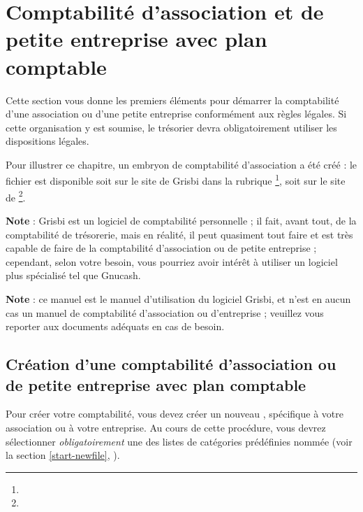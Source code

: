 \newpage


\section{Comptabilité d'association et de petite entreprise avec plan comptable\label{association-plan}}


Cette section vous donne les premiers éléments pour démarrer la comptabilité d'une association ou d'une petite entreprise conformément aux règles légales. Si cette organisation y est soumise, le trésorier devra obligatoirement utiliser les dispositions légales.

Pour illustrer ce chapitre, un embryon de comptabilité d'association a été créé : le fichier  est disponible soit sur le site de Grisbi dans la rubrique \footnote{\urlGrisbi{}}, soit sur le site de \footnote{\urlSourceForgeDocumentation{}}.

\textbf{Note} : Grisbi est un logiciel de comptabilité personnelle ; il fait, avant tout, de la comptabilité de trésorerie, mais en réalité, il peut quasiment tout faire et est très capable de faire de la comptabilité d'association ou de petite entreprise ; cependant, selon votre besoin, vous pourriez avoir intérêt à utiliser un logiciel plus spécialisé tel que \gls{Gnucash}.

\textbf{Note} : ce manuel est le manuel d'utilisation du logiciel Grisbi, et n'est en aucun cas un manuel de comptabilité d'association ou d'entreprise ; veuillez vous reporter aux documents adéquats en cas de besoin.


\subsection{Création d'une comptabilité d'association ou de petite entreprise avec plan comptable\label{association-plan-creation}}

Pour créer votre comptabilité, vous devez créer un nouveau , spécifique à votre association ou à votre entreprise. Au cours de cette procédure, vous devrez sélectionner \emph{obligatoirement} une des listes de catégories prédéfinies nommée  (voir la section \vref{start-newfile}, ).

